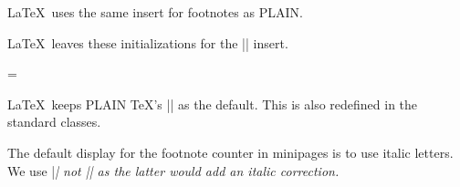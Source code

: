  \begin{macro}{\footins}
 \LaTeX\  uses the same insert for footnotes as PLAIN.
    \begin{teX}
\newinsert\footins
    \end{teX}

 \LaTeX\ leaves these initializations for the |\footins| insert.

    \begin{teX}
\skip\footins=\bigskipamount
\count{} 
\dimen\footins=8in 
    \end{teX}
 \end{macro}


 \begin{macro}{\footnoterule}
 \LaTeX\ keeps PLAIN \TeX's |\footnoterule| as the default. This is also redefined in the standard classes.

    \begin{teX}
\def\footnoterule{\kern-3\p@
  \hrule \@width 2in \kern 2.6\p@} %
    \end{teX}
 \end{macro}

 \begin{macro}{\thefootnote}
    \begin{teX}
\def\thefootnote{\@arabic\c@footnote}
    \end{teX}
 \end{macro}

 \begin{macro}{\thempfootnote}
    The default display for the footnote counter in minipages is to
    use italic letters. We use |\itshape| not |\textit| as the latter
    would add an italic correction.
    \begin{teX}
\def\thempfootnote{{\itshape\@alph\c@mpfootnote}}
    \end{teX}
 \end{macro}

 \begin{macro}{\@makefnmark}
    \begin{teX}
\def\@makefnmark{\hbox{$^{\@thefnmark}\m@th$}}
\def\@makefnmark{\hbox{\@textsuperscript{\normalfont\@thefnmark}}}
    \end{teX}
 \end{macro}


